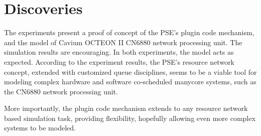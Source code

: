 \section{Discoveries}



The experiments present a proof of concept of the PSE's plugin code mechanism, and the model of Cavium OCTEON II CN6880 network processing unit. The simulation results are encouraging. In both experiments, the model acts as expected. According to the experiment results, the PSE's resource network concept, extended with customized queue disciplines, seems to be a viable tool for modeling complex hardware and software co-scheduled manycore systems, such as the CN6880 network processing unit.

More importantly, the plugin code mechanism extends to any resource network based simulation task, providing flexibility, hopefully allowing even more complex systems to be modeled.

